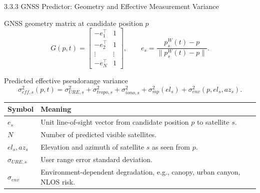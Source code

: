 \documentclass[10pt,aspectratio=169,xcolor=dvipsnames]{beamer}
\begin{document}
\begin{frame}{3.3.3 GNSS Predictor: Geometry and Effective Measurement Variance}
  \small
  \begin{block}{GNSS geometry matrix at candidate position $p$}
    \[
      G(p,t)=
      \begin{bmatrix}
        -e_1^\top & 1\\
        -e_2^\top & 1\\
        \vdots & \vdots\\
        -e_N^\top & 1
      \end{bmatrix},\qquad
      e_s=\frac{p^W_s(t)-p}{\|p^W_s(t)-p\|}.
    \]
  \end{block}

  \begin{block}{Predicted effective pseudorange variance}
    \[
      \sigma^2_{eff,s}(p,t)=
      \sigma^2_{URE,s}+\sigma^2_{tropo,s}+\sigma^2_{iono,s}
      +\sigma^2_{mp}(el_s)+\sigma^2_{env}(p,el_s,az_s).
    \]
  \end{block}

  \begin{table}\scriptsize
    \begin{tabular}{p{} p{}}
      \toprule
      \textbf{Symbol} & \textbf{Meaning}\\
      \midrule
      $e_s$ & Unit line-of-sight vector from candidate position $p$ to satellite $s$.\\
      $N$ & Number of predicted visible satellites.\\
      $el_s,az_s$ & Elevation and azimuth of satellite $s$ as seen from $p$.\\
      $\sigma_{URE,s}$ & User range error standard deviation.\\
      $\sigma_{env}$ & Environment-dependent degradation, e.g., canopy, urban canyon, NLOS risk.\\
      \bottomrule
    \end{tabular}
  \end{table}
\end{frame}
\end{document}
